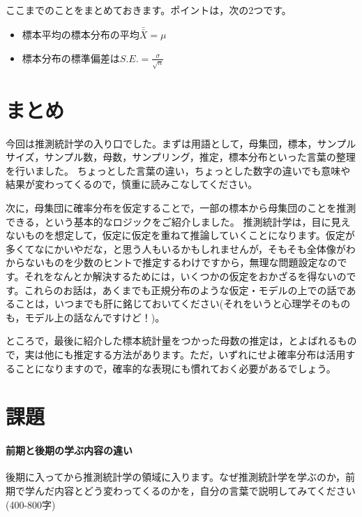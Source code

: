 \documentclass{ltjsbook}
\begin{document}
ここまでのことをまとめておきます。ポイントは，次の2つです。
\begin{itemize}
	\item 標本平均の標本分布の平均$\bar{\bar{X}}=\mu$
	\item 標本分布の標準偏差は$S.E. = \frac{\sigma}{\sqrt{n}}$
\end{itemize}


\section{まとめ}
今回は推測統計学の入り口でした。まずは用語として，母集団，標本，サンプルサイズ，サンプル数，母数，サンプリング，推定，標本分布といった言葉の整理を行いました。
ちょっとした言葉の違い，ちょっとした数字の違いでも意味や結果が変わってくるので，慎重に読みこなしてください。

次に，母集団に確率分布を仮定することで，一部の標本から母集団のことを推測できる，という基本的なロジックをご紹介しました。
推測統計学は，目に見えないものを想定して，仮定に仮定を重ねて推論していくことになります。仮定が多くてなにかいやだな，と思う人もいるかもしれませんが，そもそも全体像がわからないものを少数のヒントで推定するわけですから，無理な問題設定なのです。それをなんとか解決するためには，いくつかの仮定をおかざるを得ないのです。これらのお話は，あくまでも正規分布のような仮定・モデルの上での話であることは，いつまでも肝に銘じておいてください(それをいうと心理学そのものも，モデル上の話なんですけど！)。

ところで，最後に紹介した標本統計量をつかった母数の推定は，とよばれるもので，実は他にも推定する方法があります。ただ，いずれにせよ確率分布は活用することになりますので，確率的な表現にも慣れておく必要があるでしょう。

\section{課題}
\paragraph{前期と後期の学ぶ内容の違い}後期に入ってから推測統計学の領域に入ります。なぜ推測統計学を学ぶのか，前期で学んだ内容とどう変わってくるのかを，自分の言葉で説明してみてください(400-800字)
\end{document}
